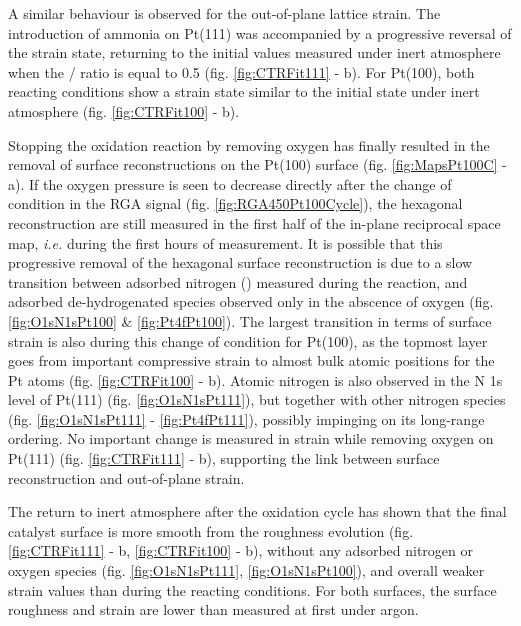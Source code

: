 A similar behaviour is observed for the out-of-plane lattice strain.
The introduction of ammonia on Pt(111) was accompanied by a progressive reversal of the strain state, returning to the initial values measured under inert atmosphere when the / ratio is equal to \num{0.5} (fig. \ref{fig:CTRFit111} - b).
For Pt(100), both reacting conditions show a strain state similar to the initial state under inert atmosphere (fig. \ref{fig:CTRFit100} - b).


Stopping the oxidation reaction by removing oxygen has finally resulted in the removal of surface reconstructions on the Pt(100) surface (fig. \ref{fig:MapsPt100C} - a).
If the oxygen pressure is seen to decrease directly after the change of condition in the RGA signal (fig. \ref{fig:RGA450Pt100Cycle}), the hexagonal reconstruction are still measured in the first half of the in-plane reciprocal space map, \textit{i.e.} during the first hours of measurement.
It is possible that this progressive removal of the hexagonal surface reconstruction is due to a slow transition between adsorbed nitrogen () measured during the reaction, and adsorbed de-hydrogenated species observed only in the abscence of oxygen (fig. \ref{fig:O1sN1sPt100} \& \ref{fig:Pt4fPt100}).
The largest transition in terms of surface strain is also during this change of condition for Pt(100), as the topmost layer goes from important compressive strain to almost bulk atomic positions for the Pt atoms (fig. \ref{fig:CTRFit100} - b).
Atomic nitrogen is also observed in the N 1s level of Pt(111) (fig. \ref{fig:O1sN1sPt111}), but together with other nitrogen species (fig. \ref{fig:O1sN1sPt111} - \ref{fig:Pt4fPt111}), possibly impinging on its long-range ordering.
No important change is measured in strain while removing oxygen on Pt(111) (fig. \ref{fig:CTRFit111} - b), supporting the link between surface reconstruction and out-of-plane strain.


The return to inert atmosphere after the oxidation cycle has shown that the final catalyst surface is more smooth from the roughness evolution (fig. \ref{fig:CTRFit111} - b, \ref{fig:CTRFit100} - b), without any adsorbed nitrogen or oxygen species (fig. \ref{fig:O1sN1sPt111}, \ref{fig:O1sN1sPt100}), and overall weaker strain values than during the reacting conditions.
For both surfaces, the surface roughness and strain are lower than measured at first under argon.

